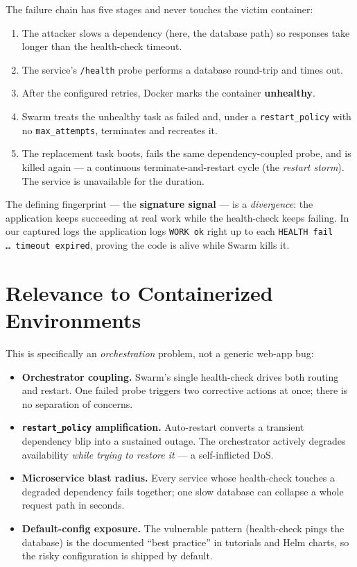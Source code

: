 \documentclass[11pt]{article}
\begin{document}
The failure chain has five stages and never touches the victim container:

\begin{enumerate}[nosep]
\item The attacker slows a dependency (here, the database path) so responses
  take longer than the health-check timeout.
\item The service's \texttt{/health} probe performs a database round-trip and
  times out.
\item After the configured retries, Docker marks the container
  \textbf{unhealthy}.
\item Swarm treats the unhealthy task as failed and, under a
  \texttt{restart\_policy} with no \texttt{max\_attempts}, terminates and
  recreates it.
\item The replacement task boots, fails the same dependency-coupled probe, and
  is killed again --- a continuous terminate-and-restart cycle (the
  \emph{restart storm}). The service is unavailable for the duration.
\end{enumerate}

The defining fingerprint --- the \textbf{signature signal} --- is a
\emph{divergence}: the application keeps succeeding at real work while the
health-check keeps failing. In our captured logs the application logs
\texttt{WORK ok} right up to each \texttt{HEALTH fail \ldots\ timeout expired},
proving the code is alive while Swarm kills it.

\section{Relevance to Containerized Environments}

This is specifically an \emph{orchestration} problem, not a generic web-app bug:

\begin{itemize}[nosep]
\item \textbf{Orchestrator coupling.} Swarm's single health-check drives both
  routing and restart. One failed probe triggers two corrective actions at
  once; there is no separation of concerns.
\item \textbf{\texttt{restart\_policy} amplification.} Auto-restart converts a
  transient dependency blip into a sustained outage. The orchestrator actively
  degrades availability \emph{while trying to restore it} --- a self-inflicted
  DoS.
\item \textbf{Microservice blast radius.} Every service whose health-check
  touches a degraded dependency fails together; one slow database can collapse a
  whole request path in seconds.
\item \textbf{Default-config exposure.} The vulnerable pattern (health-check
  pings the database) is the documented ``best practice'' in tutorials and Helm
  charts, so the risky configuration is shipped by default.
\end{itemize}
\end{document}
